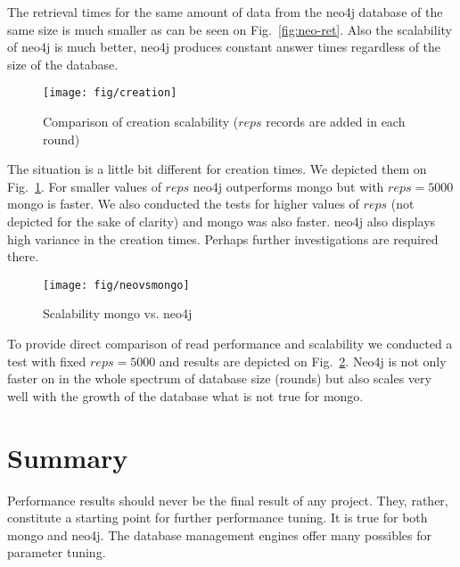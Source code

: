 \documentclass[a4paper,10pt]{article}
\begin{document}
The retrieval times for the same amount of data from the neo4j database of the 
same size is much smaller as can be seen on Fig.~\ref{fig:neo-ret}. Also the 
scalability of neo4j is much better, neo4j produces constant answer times 
regardless of the size of the database. 


\begin{figure}
\centering
 \texttt{[image: fig/creation]}
 \caption{Comparison of creation scalability ($reps$ records are added in each round)} \label{fig:creation}
\end{figure}

The situation is a little bit different for creation times. We depicted them on 
Fig.~\ref{fig:creation}. For smaller values of $reps$ neo4j outperforms mongo 
but with $reps = 5000$ mongo is faster. We also conducted the tests for higher 
values of $reps$ (not depicted for the sake of clarity) and mongo was also 
faster. neo4j also displays high variance in the creation times. Perhaps further 
investigations are required there. 

\begin{figure}
\centering
 \texttt{[image: fig/neovsmongo]}
 \caption{Scalability mongo vs. neo4j} \label{fig:mongovsneo}
\end{figure}

To provide direct comparison of read performance and scalability we conducted 
a test with fixed $reps = 5000$ and results are depicted on Fig.~\ref{fig:mongovsneo}.
Neo4j is not only faster on in the whole spectrum of database size (rounds) but 
also scales very well with the growth of the database what is not true for mongo.


\section{Summary}
Performance results should never be the final result of any project. They, rather, constitute
a starting point for further performance tuning. It is true for both mongo and neo4j. The database
management engines offer many possibles for parameter tuning. 
\end{document}
